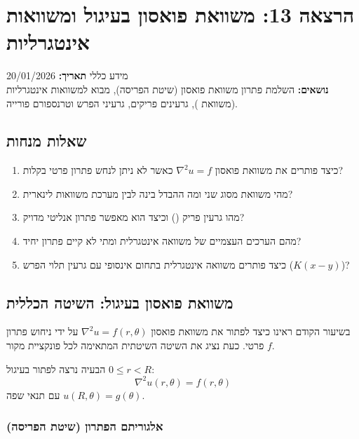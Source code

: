 \section{הרצאה 13: משוואת פואסון בעיגול ומשוואות אינטגרליות}
\date{20.01.2026}

\begin{mainbox}{מידע כללי}
\textbf{תאריך:} 20/01/2026\\
\textbf{נושאים:} השלמת פתרון משוואת פואסון (שיטת הפריסה), מבוא למשוואות אינטגרליות (משוואת ), גרעינים פריקים, גרעיני הפרש וטרנספורם פורייה.
\end{mainbox}

\subsection*{שאלות מנחות}
\begin{enumerate}[label=\textbf{\arabic*.}, rightmargin=2em, leftmargin=1em]
\item כיצד פותרים את משוואת פואסון $\nabla^2 u = f$ כאשר לא ניתן לנחש פתרון פרטי בקלות?
\item מהי משוואת  מסוג שני ומה ההבדל בינה לבין מערכת משוואות לינארית?
\item מהו גרעין פריק () וכיצד הוא מאפשר פתרון אנליטי מדויק?
\item מהם הערכים העצמיים של משוואה אינטגרלית ומתי לא קיים פתרון יחיד?
\item כיצד פותרים משוואה אינטגרלית בתחום אינסופי עם גרעין תלוי הפרש ($K(x-y)$)?
\end{enumerate}

\subsection{משוואת פואסון בעיגול: השיטה הכללית}

בשיעור הקודם ראינו כיצד לפתור את משוואת פואסון $\nabla^2 u = f(r,\theta)$ על ידי ניחוש פתרון פרטי. כעת נציג את השיטה השיטתית  המתאימה לכל פונקציית מקור $f$.

\begin{formulabox}{הבעיה}
נרצה לפתור בעיגול $0 \le r < R$:
\[
\nabla^2 u(r, \theta) = f(r, \theta)
\]
עם תנאי שפה $u(R, \theta) = g(\theta)$.
\end{formulabox}

\subsubsection*{אלגוריתם הפתרון (שיטת הפריסה)}

